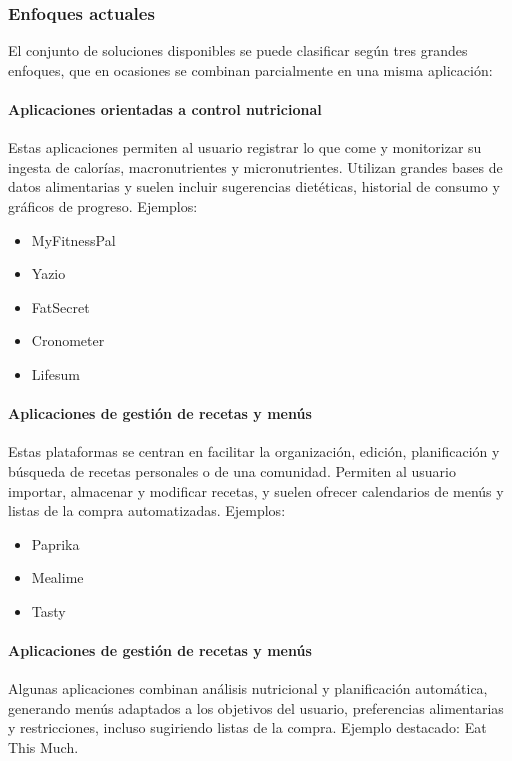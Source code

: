 \subsubsection*{Enfoques actuales}

El conjunto de soluciones disponibles se puede clasificar según tres grandes enfoques, que en ocasiones se combinan parcialmente en una misma aplicación:


\paragraph*{Aplicaciones orientadas a control nutricional}
Estas aplicaciones permiten al usuario registrar lo que come y monitorizar su ingesta de calorías, macronutrientes y micronutrientes. Utilizan grandes bases de datos alimentarias y suelen incluir sugerencias dietéticas, historial de consumo y gráficos de progreso. Ejemplos:

\begin{itemize}
  \item MyFitnessPal
  \item Yazio
  \item FatSecret
  \item Cronometer
  \item Lifesum
\end{itemize}

\paragraph*{Aplicaciones de gestión de recetas y menús}
Estas plataformas se centran en facilitar la organización, edición, planificación y búsqueda de recetas personales o de una comunidad. Permiten al usuario importar, almacenar y modificar recetas, y suelen ofrecer calendarios de menús y listas de la compra automatizadas. Ejemplos:

\begin{itemize}
  \item Paprika
  \item Mealime
  \item Tasty
\end{itemize}

\paragraph*{Aplicaciones de gestión de recetas y menús}
Algunas aplicaciones combinan análisis nutricional y planificación automática, generando menús adaptados a los objetivos del usuario, preferencias alimentarias y restricciones, incluso sugiriendo listas de la compra. Ejemplo destacado: Eat This Much.

